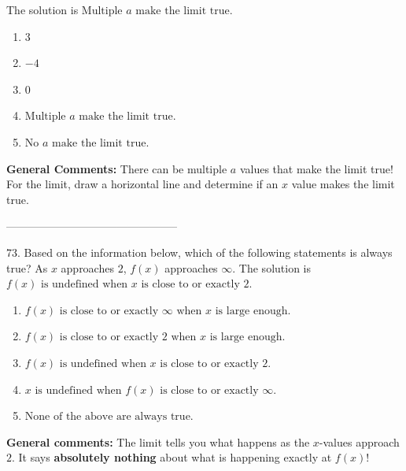 \documentclass{extbook}[14pt]
\begin{document}
The solution is $ \text{Multiple } a \text{ make the limit true}. $ 

\begin{enumerate}[label=\Alph*.] 
\item $ 3 $ 

  
\item $ -4 $ 

  
\item $ 0 $ 

  
\item $ \text{Multiple } a \text{ make the limit true}. $ 

  
\item $ \text{No } a \text{ make the limit true}. $ 

  
\end{enumerate} 
 
\textbf{General Comments:} There can be multiple $a$ values that make the limit true! For the limit, draw a horizontal line and determine if an $x$ value makes the limit true.

-----------------------------------------------

73. Based on the information below, which of the following statements is always true?
As $x$ approaches $2$, $f(x)$ approaches $\infty$. 
The solution is $ f(x) \text{ is undefined when } x \text{ is close to or exactly } 2. $ 

\begin{enumerate}[label=\Alph*.] 
\item $ f(x) \text{ is close to or exactly } \infty \text{ when } x \text{ is large enough}. $ 

  
\item $ f(x) \text{ is close to or exactly } 2 \text{ when } x \text{ is large enough}. $ 

  
\item $ f(x) \text{ is undefined when } x \text{ is close to or exactly } 2. $ 

  
\item $ x \text{ is undefined when } f(x) \text{ is close to or exactly } \infty. $ 

  
\item $ \text{None of the above are always true.} $ 

  
\end{enumerate} 
 
\textbf{General comments:} The limit tells you what happens as the $x$-values approach $2$. It says \textbf{absolutely nothing} about what is happening exactly at $f(x)$!
\end{document}

